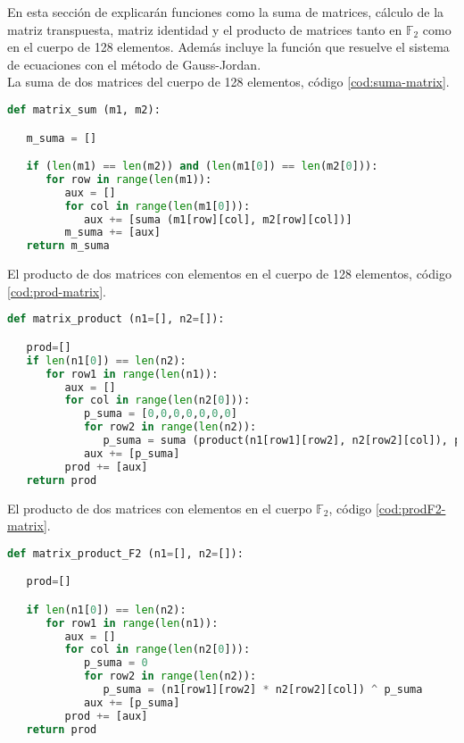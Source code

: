 En esta sección de explicarán funciones como la suma de matrices, cálculo de la matriz transpuesta, matriz identidad y el producto de matrices tanto en $\mathds{F}_2$ como en el cuerpo de 128 elementos. Además incluye la función que resuelve el sistema de ecuaciones con el método de Gauss-Jordan.\\


La suma de dos matrices del cuerpo de 128 elementos, código \ref{cod:suma-matrix}.

\begin{lstlisting}[language=Python,caption=Suma de dos matrices con elementos en el cuerpo, label=cod:suma-matrix]
def matrix_sum (m1, m2):

   m_suma = []

   if (len(m1) == len(m2)) and (len(m1[0]) == len(m2[0])):
      for row in range(len(m1)):
         aux = []
         for col in range(len(m1[0])):
            aux += [suma (m1[row][col], m2[row][col])]
         m_suma += [aux]
   return m_suma
\end{lstlisting}


El producto de dos matrices con elementos en el cuerpo de 128 elementos, código \ref{cod:prod-matrix}.\\

\begin{lstlisting}[language=Python,caption=Producto de matrices con elementos del cuerpo, label=cod:prod-matrix]
def matrix_product (n1=[], n2=[]):

   prod=[]
   if len(n1[0]) == len(n2):
      for row1 in range(len(n1)):
         aux = []
         for col in range(len(n2[0])):
            p_suma = [0,0,0,0,0,0,0]
            for row2 in range(len(n2)):
               p_suma = suma (product(n1[row1][row2], n2[row2][col]), p_suma)
            aux += [p_suma]
         prod += [aux]
   return prod
\end{lstlisting}


El producto de dos matrices con elementos en el cuerpo $\mathds{F}_2$, código \ref{cod:prodF2-matrix}.\\

\begin{lstlisting}[language=Python,caption=Producto de matrices con elementos en $\mathds{F}_2$, label=cod:prodF2-matrix]
def matrix_product_F2 (n1=[], n2=[]):

   prod=[]

   if len(n1[0]) == len(n2):
      for row1 in range(len(n1)):
         aux = []
         for col in range(len(n2[0])):
            p_suma = 0
            for row2 in range(len(n2)):
               p_suma = (n1[row1][row2] * n2[row2][col]) ^ p_suma
            aux += [p_suma]
         prod += [aux]
   return prod
\end{lstlisting}

